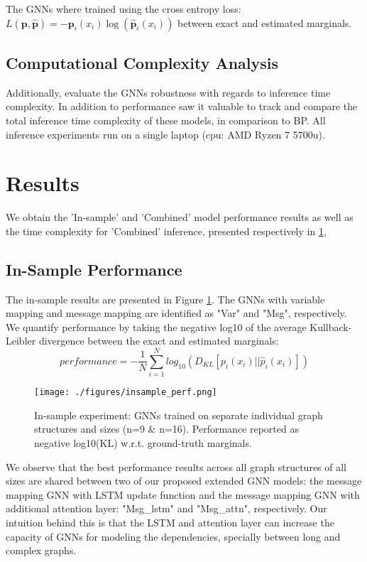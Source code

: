 \documentclass{article}
\begin{document}
The GNNs where trained using the cross entropy loss: $L(\bm{p}, \bm{\hat{p}})= -\bm{p}_i(x_i)\log(\bm{\hat{p}}_i(x_i))$ between exact and estimated marginals.

\subsection{Computational Complexity Analysis}

Additionally, evaluate the GNNs robustness with regards to inference time complexity. In addition to performance saw it valuable to track and compare the total inference time complexity of these models, in comparison to BP. All inference experiments run on a single laptop (cpu: AMD Ryzen 7 5700u). 

\section{Results}

We obtain the 'In-sample' and 'Combined' model performance results as well as the time complexity for 'Combined' inference, presented respectively in \ref{fig:in_perf}, 

\subsection{In-Sample Performance}

The in-sample results are presented in Figure \ref{fig:in_perf}. The GNNs with variable mapping and message mapping are identified as "Var" and "Msg", respectively. We quantify performance by taking the negative log10 of the average Kullback-Leibler divergence between the exact and estimated marginals: 
\begin{equation}
    performance = -\dfrac{1}{N}\sum_{i=1}^N log_{10}(D_{KL}[p_i(x_i) || \hat{p}_i(x_i)])
\end{equation}

\begin{figure}[ht]
    \centering
    \texttt{[image: ./figures/insample\_perf.png]}
    \caption{In-sample experiment: GNNs trained on separate individual graph structures and sizes (n=9 \& n=16). Performance reported as negative log10(KL) w.r.t. ground-truth marginals.}
    \label{fig:in_perf}
\end{figure}
We observe that the best performance results across all graph structures of all sizes are shared between two of our proposed extended GNN models: the message mapping GNN with LSTM update function and the message mapping GNN with additional attention layer: "Msg\_lstm" and "Msg\_attn", respectively. Our intuition behind this is that the LSTM and attention layer can increase the capacity of GNNs for modeling the dependencies, specially between long and complex graphs.
\end{document}
